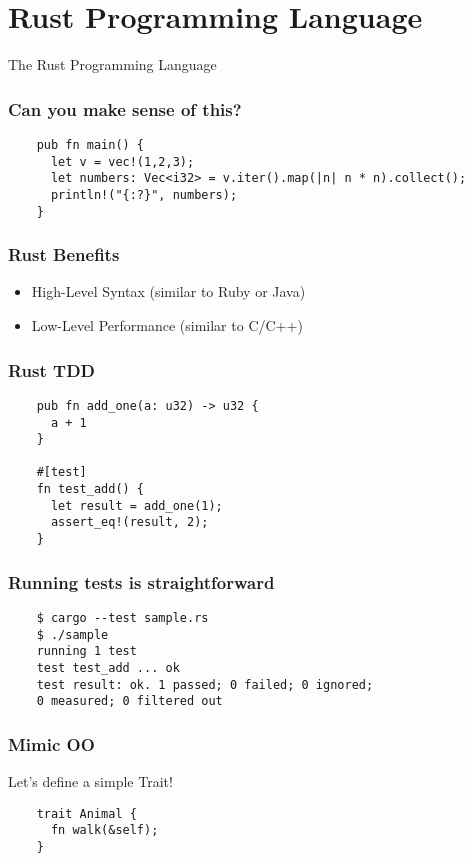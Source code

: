 \section{Rust Programming Language}
\label{sec:rust-language}

\begin{frame}
  \centerline{
    \huge{The Rust Programming Language}
  }
\end{frame}

\begin{frame}[fragile]
  \frametitle{Can you make sense of this?}
  \begin{verbatim}
    pub fn main() {
      let v = vec!(1,2,3);
      let numbers: Vec<i32> = v.iter().map(|n| n * n).collect();
      println!("{:?}", numbers);
    }
  \end{verbatim}
\end{frame}

\begin{frame}
  \frametitle{Rust Benefits}
  \begin{itemize}
  \item High-Level Syntax (similar to Ruby or Java)
  \item Low-Level Performance (similar to C/C++)
  \end{itemize}
\end{frame}

\begin{frame}[fragile]
  \frametitle{Rust  TDD}
  \begin{verbatim}
    pub fn add_one(a: u32) -> u32 {
      a + 1
    }

    #[test]
    fn test_add() {
      let result = add_one(1);
      assert_eq!(result, 2);
    }
  \end{verbatim}
\end{frame}

\begin{frame}[fragile]
  \frametitle{Running tests is straightforward}
  \begin{verbatim}
    $ cargo --test sample.rs
    $ ./sample
    running 1 test
    test test_add ... ok
    test result: ok. 1 passed; 0 failed; 0 ignored;
    0 measured; 0 filtered out
  \end{verbatim}
\end{frame}

\begin{frame}[fragile]
  \frametitle{Mimic OO}
  Let's define a simple Trait! \break{}
  \begin{verbatim}
    trait Animal {
      fn walk(&self);
    }
  \end{verbatim}
\end{frame}

